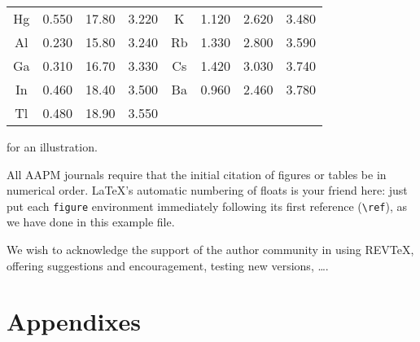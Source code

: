 \documentclass[%
 aapm,
 mph,%
 amsmath,amssymb,
preprint,%
 reprint,%
]{revtex4-2}
\begin{document}
\begin{table}
\begin{ruledtabular}
\begin{tabular}{cccccccc}
      Hg & 0.550       & 17.80       & 3.220        & K\footnotemark[5]
         & 1.120       & 2.620       & 3.480                                     \\
      Al & 0.230       & 15.80       & 3.240        & Rb\footnotemark[3]
         & 1.330       & 2.800       & 3.590                                     \\
      Ga & 0.310       & 16.70       & 3.330        & Cs\footnotemark[4]
         & 1.420       & 3.030       & 3.740                                     \\
      In & 0.460       & 18.40       & 3.500        & Ba\footnotemark[5]
         & 0.960       & 2.460       & 3.780                                     \\
      Tl & 0.480       & 18.90       & 3.550        &                    &  &  & \\
    \end{tabular}
  \end{ruledtabular}
\end{table}
for an illustration.

All AAPM journals require that the initial citation of
figures or tables be in numerical order.
\LaTeX's automatic numbering of floats is your friend here:
just put each \texttt{figure} environment immediately following
its first reference (\verb+\ref+), as we have done in this example file.

\begin{acknowledgments}
  We wish to acknowledge the support of the author community in using
  REV\TeX{}, offering suggestions and encouragement, testing new versions,
  \dots.
\end{acknowledgments}

\appendix

\section{Appendixes}
\end{document}
